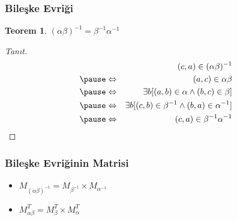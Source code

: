 \documentclass[dvipsnames]{beamer}
\theoremstyle{definition}
\theoremstyle{example}
\theoremstyle{plain}
\newtheorem{teorem}[theorem]{Teorem}
\begin{document}
\begin{frame}
  \frametitle{Bileşke Evriği}

  \begin{teorem}
    $(\alpha \beta)^{-1} = \beta^{-1} \alpha^{-1}$
  \end{teorem}

  \pause
  \begin{proof}[Tanıt]
    \begin{eqnarray*}
      &                 & (c,a) \in (\alpha \beta)^{-1}\\\pause
      & \Leftrightarrow & (a,c) \in \alpha \beta\\\pause
      & \Leftrightarrow & \exists b [(a,b) \in \alpha
                              \wedge (b,c) \in \beta]\\\pause
      & \Leftrightarrow & \exists b [(c,b) \in \beta^{-1}
                              \wedge (b,a) \in \alpha^{-1}]\\\pause
      & \Leftrightarrow & (c,a) \in \beta^{-1}\alpha^{-1}
    \end{eqnarray*}
  \end{proof}
\end{frame}

\begin{frame}
  \frametitle{Bileşke Evriğinin Matrisi}

  \begin{itemize}
    \item $M_{(\alpha \beta)^{-1}} = M_{\beta^{-1}} \times M_{\alpha^{-1}}$
    \item $M_{\alpha \beta}^{T} = M_{\beta}^{T} \times M_{\alpha}^{T}$
  \end{itemize}
\end{frame}
\end{document}
